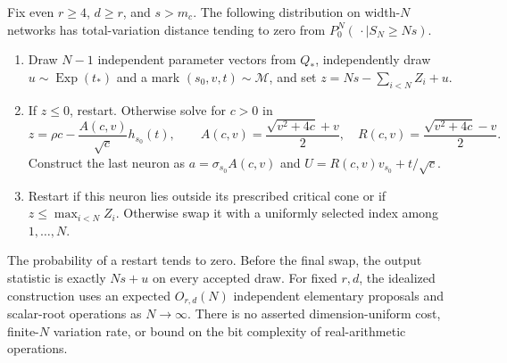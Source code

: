 \begin{theorem}
Fix even $r\ge4$, $d\ge r$, and $s>m_c$. The following distribution
on width-$N$ networks has total-variation distance tending to zero from
$P_0^N(\,\cdot\mid S_N\ge Ns)$.
\begin{enumerate}
\item Draw $N-1$ independent parameter vectors from $Q_*$, independently
draw $u\sim\operatorname{Exp}(t_*)$ and a mark $(s_0,v,t)\sim\mathcal M$,
and set $z=Ns-\sum_{i<N}Z_i+u$.
\item If $z\le0$, restart. Otherwise solve for $c>0$ in
\[
 z=\rho c-\frac{A(c,v)}{\sqrt c}h_{s_0}(t),\qquad
 A(c,v)=\frac{\sqrt{v^2+4c}+v}{2},\quad
 R(c,v)=\frac{\sqrt{v^2+4c}-v}{2}.                       \tag{20}
\]
Construct the last neuron as
$a=\sigma_{s_0}A(c,v)$ and
$U=R(c,v)v_{s_0}+t/\sqrt c$.
\item Restart if this neuron lies outside its prescribed critical cone
or if $z\le\max_{i<N}Z_i$. Otherwise swap it with a uniformly selected
index among $1,\ldots,N$.
\end{enumerate}
The probability of a restart tends to zero. Before the final swap,
the output statistic is exactly $Ns+u$ on every accepted draw.
For fixed $r,d$, the idealized construction uses an expected $O_{r,d}(N)$
independent elementary proposals and scalar-root operations as $N\to\infty$.
There is no asserted dimension-uniform cost, finite-$N$ variation rate,
or bound on the bit complexity of real-arithmetic operations.
\end{theorem}
